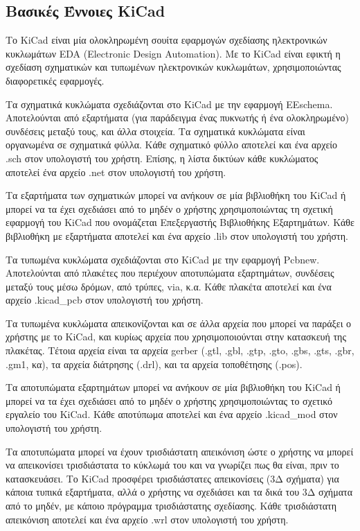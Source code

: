 \documentclass[a4paper]{article}
\begin{document}
\subsection{Βασικές Έννοιες KiCad}
Το \textenglish{KiCad} είναι μία ολοκληρωμένη σουίτα εφαρμογών σχεδίασης ηλεκτρονικών κυκλωμάτων \textenglish{EDA (Electronic Design Automation)}. Με το \textenglish{KiCad} είναι εφικτή η σχεδίαση σχηματικών και τυπωμένων ηλεκτρονικών κυκλωμάτων, χρησιμοποιώντας διαφορετικές εφαρμογές.

Τα σχηματικά κυκλώματα σχεδιάζονται στο \textenglish{KiCad} με την εφαρμογή \textenglish{EEschema}. Αποτελούνται από εξαρτήματα (για παράδειγμα ένας πυκνωτής ή ένα ολοκληρωμένο) συνδέσεις μεταξύ τους, και άλλα στοιχεία. Τα σχηματικά κυκλώματα είναι οργανωμένα σε σχηματικά φύλλα. Κάθε σχηματικό φύλλο αποτελεί και ένα αρχείο .sch στον υπολογιστή του χρήστη. Επίσης, η λίστα δικτύων κάθε κυκλώματος αποτελεί ένα αρχείο .net στον υπολογιστή του χρήστη.

Τα εξαρτήματα των σχηματικών μπορεί να ανήκουν σε μία βιβλιοθήκη του \textenglish{KiCad} ή μπορεί να τα έχει σχεδιάσει από το μηδέν ο χρήστης χρησιμοποιώντας τη σχετική εφαρμογή του \textenglish{KiCad} που ονομάζεται Επεξεργαστής Βιβλιοθήκης Εξαρτημάτων. Κάθε βιβλιοθήκη με εξαρτήματα αποτελεί και ένα αρχείο .lib στον υπολογιστή του χρήστη.

Τα τυπωμένα κυκλώματα σχεδιάζονται στο \textenglish{KiCad} με την εφαρμογή Pcbnew. Αποτελούνται από πλακέτες που περιέχουν αποτυπώματα εξαρτημάτων, συνδέσεις μεταξύ τους μέσω δρόμων, από τρύπες, via, κ.α.
Κάθε πλακέτα αποτελεί και ένα αρχείο .kicad\_pcb στον υπολογιστή του χρήστη. 

Τα τυπωμένα κυκλώματα απεικονίζονται και σε άλλα αρχεία που μπορεί να παράξει ο χρήστης με το \textenglish{KiCad}, και κυρίως αρχεία που χρησιμοποιούνται στην κατασκευή της πλακέτας. Τέτοια αρχεία είναι τα αρχεία gerber (.gtl, .gbl, .gtp, .gto, .gbs, .gts, .gbr, .gm1, κα), τα αρχεία διάτρησης (.drl), και τα αρχεία τοποθέτησης (.pos).

Τα αποτυπώματα εξαρτημάτων μπορεί να ανήκουν σε μία βιβλιοθήκη του \textenglish{KiCad} ή μπορεί να τα έχει σχεδιάσει από το μηδέν ο χρήστης χρησιμοποιώντας το σχετικό εργαλείο του \textenglish{KiCad}. Κάθε αποτύπωμα αποτελεί και ένα αρχείο .kicad\_mod στον υπολογιστή του χρήστη. %

Τα αποτυπώματα μπορεί να έχουν τρισδιάστατη απεικόνιση ώστε ο χρήστης να μπορεί να απεικονίσει τρισδιάστατα το κύκλωμά του και να γνωρίζει πως θα είναι, πριν το κατασκευάσει. Το \textenglish{KiCad} προσφέρει τρισδιάστατες απεικονίσεις (3Δ σχήματα) για κάποια τυπικά εξαρτήματα, αλλά ο χρήστης να σχεδιάσει και τα δικά του 3Δ σχήματα από το μηδέν, με κάποιο πρόγραμμα τρισδιάστατης σχεδίασης. Κάθε τρισδιάστατη απεικόνιση αποτελεί και ένα αρχείο .wrl στον υπολογιστή του χρήστη. 
\end{document}
